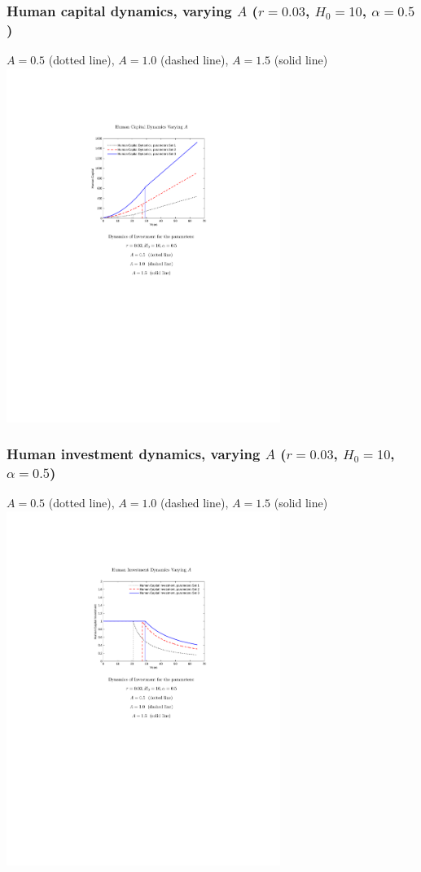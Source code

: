 \documentclass[12pt,compress,handout]{beamer}  %
\begin{document}
\begin{frame}
\frametitle{Human capital dynamics, varying $A$ ($r=0.03$,
$H_{0}=10$, $\alpha=0.5$)}
\begin{center}
{\footnotesize $A =0.5$ (dotted line), $A =1.0$ (dashed line), $A
=1.5$ (solid line)}
\includegraphics[width=3.5in]{include/fig-hc-earn-series-07.pdf}
\end{center}
\end{frame}


\begin{frame}
\frametitle{Human investment dynamics, varying $A$ ($r=0.03$,
$H_{0}=10$, $\alpha=0.5$)}
\begin{center}
{\footnotesize $A =0.5$ (dotted line), $A =1.0$ (dashed line), $A
=1.5$ (solid line)}
\includegraphics[width=3.5in]{include/fig-hc-earn-series-08.pdf}
\end{center}
\end{frame}
\end{document}
